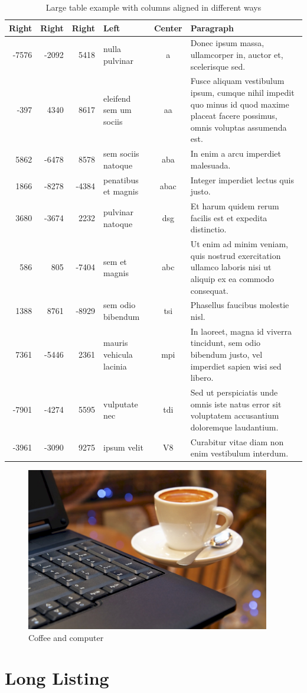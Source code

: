 \documentclass[english,master,dept460,male,cpp,cpdeclaration]{diploma}
\begin{document}
\begin{table}
	\centering
	\caption{Large table example with columns aligned in different ways}
	\label{tab:Sidewaystable}
\begin{tabular}{rrrlcp{95mm}}
\toprule
Right	&	Right	&	Right	&	Left					&	Center	&	Paragraph	\\
\midrule
-7576	&	-2092	&	5418	&	nulla pulvinar			&	a		&	Donec ipsum massa, ullamcorper in, auctor et, scelerisque sed.	\\
-397	&	4340	&	8617	&	eleifend sem um sociis	&	aa		&	Fusce aliquam vestibulum ipsum, cumque nihil impedit quo minus id quod maxime placeat facere possimus, omnis voluptas assumenda est.	\\
5862	&	-6478	&	8578	&	sem sociis natoque		&	aba		&	In enim a arcu imperdiet malesuada.	\\
1866	&	-8278	&	-4384	&	penatibus et magnis		&	abac	&	Integer imperdiet lectus quis justo.	\\
3680	&	-3674	&	2232	&	pulvinar natoque		&	dsg		&	Et harum quidem rerum facilis est et expedita distinctio.	\\
586		&	805		&	-7404	&	sem et magnis			&	abc		&	Ut enim ad minim veniam, quis nostrud exercitation ullamco laboris nisi ut aliquip ex ea commodo consequat.	\\
1388	&	8761	&	-8929	&	sem odio bibendum		&	tsi		&	Phasellus faucibus molestie nisl.	\\
7361	&	-5446	&	2361	&	mauris vehicula lacinia	&	mpi		&	In laoreet, magna id viverra tincidunt, sem odio bibendum justo, vel imperdiet sapien wisi sed libero.	\\
-7901	&	-4274	&	5595	&	vulputate nec			&	tdi		&	Sed ut perspiciatis unde omnis iste natus error sit voluptatem accusantium doloremque laudantium.	\\
-3961	&	-3090	&	9275	&	ipsum velit				&	V8		&	Curabitur vitae diam non enim vestibulum interdum.	\\
\bottomrule
\end{tabular}
\end{table}


\begin{figure}
	\centering
	\includegraphics[width=0.95\textwidth]{Figures/CoffeeAndComputer.jpg}
	\caption{Coffee and computer \cite{AhDTEmY2CY7Qv65e}}
	\label{fig:CoffeAndComputerInAppendix}
\end{figure}


\section{Long Listing}

\end{document}
